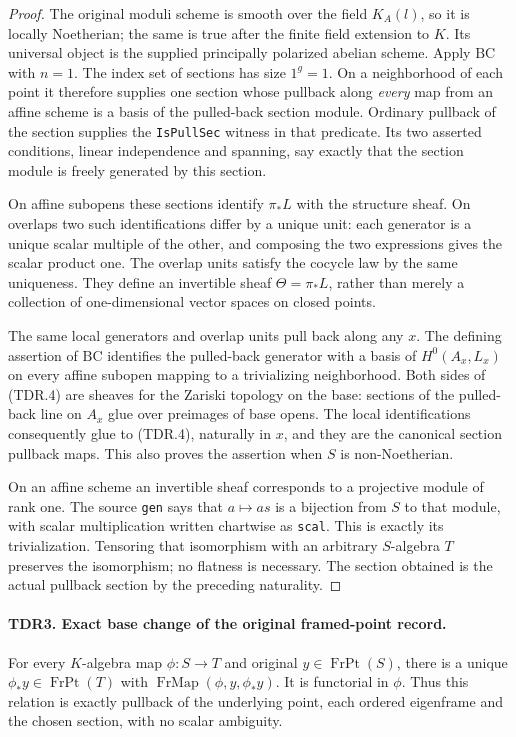 \begin{proof}
The original moduli scheme is smooth over the field \(K_A(l)\),
so it is locally Noetherian; the same is true after the finite field
extension to \(K\).  Its universal object is the supplied principally
polarized abelian scheme.  Apply \(\mathrm{BC}\) with \(n=1\).
The index set of sections has size \(1^g=1\).  On a neighborhood
of each point it therefore supplies one section whose pullback along
\emph{every} map from an affine scheme is a basis of the pulled-back
section module.  Ordinary pullback of the section supplies the
\texttt{IsPullSec} witness in that predicate.  Its two asserted
conditions, linear independence and spanning, say exactly that the
section module is freely generated by this section.

On affine subopens these sections identify \(\pi_*L\) with the
structure sheaf.  On overlaps two such identifications differ by a
unique unit: each generator is a unique scalar multiple of the other,
and composing the two expressions gives the scalar product one.
The overlap units satisfy the cocycle law by the same uniqueness.
They define an invertible sheaf \(\Theta=\pi_*L\), rather than
merely a collection of one-dimensional vector spaces on closed points.

The same local generators and overlap units pull back along any
\(x\).  The defining assertion of \(\mathrm{BC}\) identifies the
pulled-back generator with a basis of \(H^0(A_x,L_x)\) on every
affine subopen mapping to a trivializing neighborhood.  Both sides
of (TDR.4) are sheaves for the Zariski topology on the base: sections
of the pulled-back line on \(A_x\) glue over preimages of base
opens.  The local identifications consequently glue to (TDR.4),
naturally in \(x\), and they are the canonical section pullback
maps.  This also proves the assertion when \(S\) is non-Noetherian.

On an affine scheme an invertible sheaf corresponds to a projective
module of rank one.  The source \texttt{gen} says that
\(a\mapsto a s\) is a bijection from \(S\) to that module,
with scalar multiplication written chartwise as \texttt{scal}.
This is exactly its trivialization.  Tensoring that isomorphism with
an arbitrary \(S\)-algebra \(T\) preserves the isomorphism;
no flatness is necessary.  The section obtained is the actual
pullback section by the preceding naturality.
\end{proof}

\paragraph{TDR3. Exact base change of the original framed-point record.}
\label{claim:TDR3}
For every \(K\)-algebra map \(\phi:S\to T\) and original
\(y\in\operatorname{FrPt}(S)\), there is a unique
\(\phi_*y\in\operatorname{FrPt}(T)\) with
\(\operatorname{FrMap}(\phi,y,\phi_*y)\).
It is functorial in \(\phi\).  Thus this relation is exactly
pullback of the underlying point, each ordered eigenframe and the
chosen section, with no scalar ambiguity.

